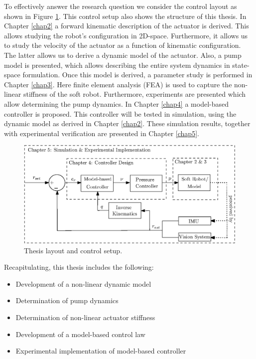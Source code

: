To effectively answer the research question we consider the control layout as shown in Figure \ref{fig1:controlarchitecture}. This control setup also shows the structure of this thesis. In Chapter \ref{chap2} a forward kinematic description of the actuator is derived. This allows studying the robot's configuration in 2D-space. Furthermore, it allows us to study the velocity of the actuator as a function of kinematic configuration. The latter allows us to derive a dynamic model of the actuator. Also, a pump model is presented, which allows describing the entire system dynamics in state-space formulation. Once this model is derived, a parameter study is performed in Chapter \ref{chap3}. Here finite element analysis (FEA) is used to capture the non-linear stiffness of the soft robot. Furthermore, experiments are presented which allow determining the pump dynamics. In Chapter \ref{chap4} a model-based controller is proposed. This controller will be tested in simulation, using the dynamic model as derived in Chapter \ref{chap2}. These simulation results, together with experimental verification are presented in Chapter \ref{chap5}.




\begin{figure}[H]
    \centering
    \includegraphics[width = \textwidth]{Figures/Chapter1/controlschemeCompleteGood.eps}
    \caption{Thesis layout and control setup.}
    \label{fig1:controlarchitecture}
\end{figure}


Recapitulating, this thesis includes the following:


\begin{itemize}
    \item Development of a non-linear dynamic model
    \item Determination of pump dynamics
    \item Determination of non-linear actuator stiffness
    \item Development of a model-based control law
    \item Experimental implementation of model-based controller
\end{itemize}


